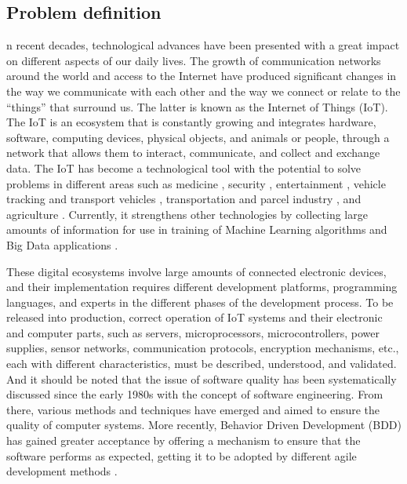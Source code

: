 \documentclass[journal]{IEEEtran}	%
\begin{document}
\subsection{Problem definition}


n recent decades, technological advances have been presented with a great impact on different aspects of our daily lives. The growth of communication networks around the world and access to the Internet have produced significant changes in the way we communicate with each other and the way we connect or relate to the “things” that surround us. The latter is known as the Internet of Things (IoT). The IoT is an ecosystem that is constantly growing and integrates hardware, software, computing devices, physical objects, and animals or people, through a network that allows them to interact, communicate, and collect and exchange data. The IoT has become a technological tool with the potential to solve problems in different areas such as medicine \cite{farahani2018towards,aktas2018iot,chen2015low}, security \cite{mao2018application}, entertainment \cite{kumar2019iot}, vehicle tracking and transport vehicles \cite{lee2014design,jisha2017iot}, transportation and parcel industry \cite{caballero2013iot,li2017iot}, and agriculture \cite{davcev2018iot,elijah2018overview}. Currently, it strengthens other technologies by collecting large amounts of information for use in training of Machine Learning algorithms and Big Data applications \cite{syafrudin2018performance,cai2016iot,luo2019development}.

These digital ecosystems involve large amounts of connected electronic devices, and their implementation requires different development platforms, programming languages, and experts in the different phases of the development process. To be released into production, correct operation of IoT systems and their electronic and computer parts, such as servers, microprocessors, microcontrollers, power supplies, sensor networks, communication protocols, encryption mechanisms, etc., each with different characteristics, must be described, understood, and validated. And it should be noted that the issue of software quality has been systematically discussed since the early 1980s with the concept of software engineering. From there, various methods and techniques have emerged and aimed to ensure the quality of computer systems. More recently, Behavior Driven Development (BDD) has gained greater acceptance by offering a mechanism to ensure that the software performs as expected, getting it to be adopted by different agile development methods \cite{nascimento2020behavior}.
\end{document}
